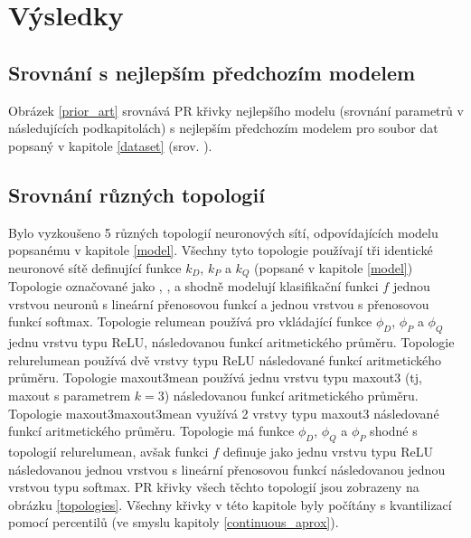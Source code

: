 \chapter{Výsledky}

\section{Srovnání s nejlepším předchozím modelem}
Obrázek \ref{prior_art} srovnává PR křivky nejlepšího modelu (srovnání parametrů v následujících podkapitolách) s nejlepším předchozím modelem pro soubor dat popsaný v kapitole \ref{dataset} (srov. \cite{machlica_learning_2017}). 


\section{Srovnání různých topologií}

Bylo vyzkoušeno 5 různých topologií neuronových sítí, odpovídajících modelu popsanému v kapitole \ref{model}. Všechny tyto topologie používají tři identické neuronové sítě definující funkce \( k_D \), \( k_P \) a \( k_Q \) (popsané v kapitole \ref{model}) Topologie označované jako , ,  a  shodně modelují klasifikační funkci \( f \) jednou vrstvou neuronů s lineární přenosovou funkcí a jednou vrstvou s přenosovou funkcí softmax. Topologie relumean používá pro vkládající funkce \( \phi_D \), \( \phi_P \) a \( \phi_Q \) jednu vrstvu typu ReLU, následovanou funkcí aritmetického průměru. Topologie relurelumean používá dvě vrstvy typu ReLU následované funkcí aritmetického průměru. Topologie maxout3mean používá jednu vrstvu typu maxout3 (tj, maxout s parametrem \( k = 3 \)) následovanou funkcí aritmetického průměru. Topologie maxout3maxout3mean využívá 2 vrstvy typu maxout3 následované funkcí aritmetického průměru. Topologie  má funkce \( \phi_D \), \( \phi_Q \) a \( \phi_P  \) shodné s topologií relurelumean, avšak funkci \( f \) definuje jako jednu vrstvu typu ReLU následovanou jednou vrstvou s lineární přenosovou funkcí následovanou jednou vrstvou typu softmax. PR křivky všech těchto topologií jsou zobrazeny na obrázku \ref{topologies}. Všechny křivky v této kapitole byly počítány s kvantilizací pomocí percentilů (ve smyslu kapitoly \ref{continuous_aprox}).

